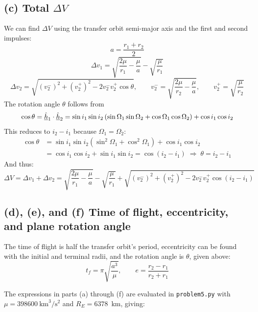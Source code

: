 \subsection*{(c) Total $\Delta V$}
We can find $\Delta V$ using the transfer orbit semi-major axis and the first and second impulses:
\begin{equation*}
a = \frac{r_1+r_2}{2}
\end{equation*}
\begin{equation*}
\Delta v_1 = \sqrt{\frac{2\mu}{r_1}-\frac{\mu}{a}} - \sqrt{\frac{\mu}{r_1}}
\end{equation*}
\begin{equation*}
\Delta v_2 = \sqrt{(v_2^-)^2 + (v_2^+)^2 - 2v_2^-v_2^+\cos\theta}, \qquad
v_2^- = \sqrt{\frac{2\mu}{r_2}-\frac{\mu}{a}}, \qquad v_2^+ = \sqrt{\frac{\mu}{r_2}}
\end{equation*}
The rotation angle $\theta$ follows from
\begin{equation*}
\cos\theta = \hat{\underline{h}}_1\cdot\hat{\underline{h}}_2
= \sin i_1\sin i_2\left(\sin\Omega_1\sin\Omega_2 + \cos\Omega_1\cos\Omega_2\right) + \cos i_1\cos i_2
\end{equation*}
This reduces to $i_2-i_1$ because $\Omega_1=\Omega_2$:
\begin{align*}
\cos\theta &= \sin i_1\sin i_2\left(\sin^2\Omega_1 + \cos^2\Omega_1\right) + \cos i_1\cos i_2 \\
&= \cos i_1\cos i_2 + \sin i_1\sin i_2 = \cos(i_2-i_1)
\;\Rightarrow\; \theta = i_2 - i_1
\end{align*}
And thus:
\begin{equation*}
\boxed{\Delta V = \Delta v_1 + \Delta v_2
= \sqrt{\frac{2\mu}{r_1}-\frac{\mu}{a}} - \sqrt{\frac{\mu}{r_1}}
+ \sqrt{(v_2^-)^2 + (v_2^+)^2 - 2v_2^-v_2^+\cos(i_2-i_1)}}
\end{equation*}

\subsection*{(d), (e), and (f) Time of flight, eccentricity, and plane rotation angle}
The time of flight is half the transfer orbit's period, eccentricity can be found with the initial and terminal radii, and the rotation angle is $\theta$, given above:
\begin{equation*}
t_f = \pi\sqrt{\frac{a^3}{\mu}}, \qquad
e = \frac{r_2-r_1}{r_2+r_1}
\end{equation*}

\medskip
\noindent The expressions in parts (a) through (f) are evaluated in \texttt{problem5.py} with $\mu = 398600~\text{km}^3/\text{s}^2$ and $R_E = 6378$~km, giving:

